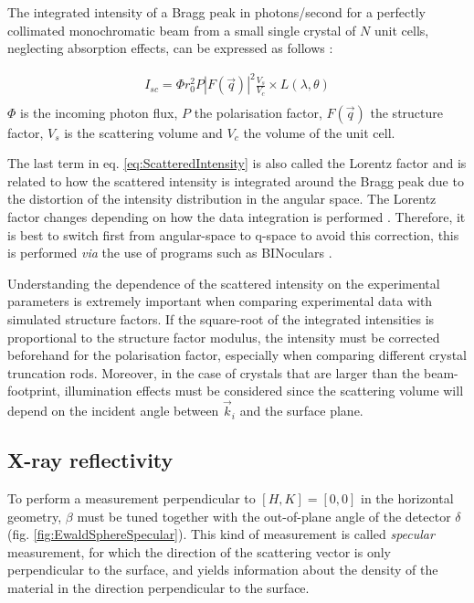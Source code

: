 The integrated intensity of a Bragg peak in photons/second for a perfectly collimated monochromatic beam from a small single crystal of $N$ unit cells, neglecting absorption effects, can be expressed as follows \parencite{NielsenMcMorrow}:

\begin{gather}
    \label{eq:ScatteredIntensity}
    I_{sc} = \Phi r_0^2 P |F(\vec{q})|^2 \frac{V_s}{V_c} \times L(\lambda, \theta)\\
\end{gather}
$\Phi$ is the incoming photon flux, $P$ the polarisation factor, $F(\vec{q})$ the structure factor, $V_s$ is the scattering volume and $V_c$ the volume of the unit cell.

The last term in eq. \ref{eq:ScatteredIntensity} is also called the Lorentz factor and is related to how the scattered intensity is integrated around the Bragg peak due to the distortion of the intensity distribution in the angular space.
The Lorentz factor changes depending on how the data integration is performed \parencite{Robach2000, Drnec2014}.
Therefore, it is best to switch first from angular-space to q-space to avoid this correction, this is performed \textit{via} the use of programs such as BINoculars \parencite{Roobol2015}.

Understanding the dependence of the scattered intensity on the experimental parameters is extremely important when comparing experimental data with simulated structure factors.
If the square-root of the integrated intensities is proportional to the structure factor modulus, the intensity must be corrected beforehand for the polarisation factor, especially when comparing different crystal truncation rods.
Moreover, in the case of crystals that are larger than the beam-footprint, illumination effects must be considered since the scattering volume will depend on the incident angle between $\vec{k}_i$ and the surface plane.

\subsection{X-ray reflectivity}\label{sec:XRR}

To perform a measurement perpendicular to $[H, K] = [0, 0]$ in the horizontal geometry, $\beta$ must be tuned together with the out-of-plane angle of the detector $\delta$ (fig. \ref{fig:EwaldSphereSpecular}).
This kind of measurement is called \textit{specular} measurement, for which the direction of the scattering vector is only perpendicular to the surface, and yields information about the density of the material in the direction perpendicular to the surface.

